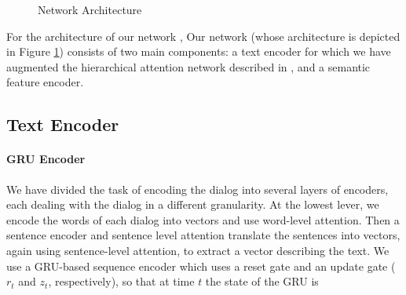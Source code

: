 \begin{figure}
\begin{center}
\caption{Network Architecture}\label{fig:arch}
\end{center}
\end{figure}
For the architecture of our network , 
Our network (whose architecture is depicted in Figure \ref{fig:arch}) consists of two main components: 
a text encoder for which we have augmented the hierarchical attention network described in \cite{attention}, 
and a semantic feature encoder. 

\subsection{Text Encoder}

\paragraph*{GRU Encoder}
We have divided the task of encoding the dialog into several 
layers of encoders, each dealing with the dialog in a different granularity. 
At the lowest lever, we encode the words of each dialog into vectors 
and use word-level attention. Then a sentence encoder and sentence level attention 
translate the sentences into vectors, again using sentence-level attention, to extract a vector describing the text. 
We use a GRU-based sequence encoder \cite{BahdanauCB14} which uses 
a reset gate and an update gate ($r_t$ and $z_t$, respectively), 
so that at time $t$ the state of the GRU is 

